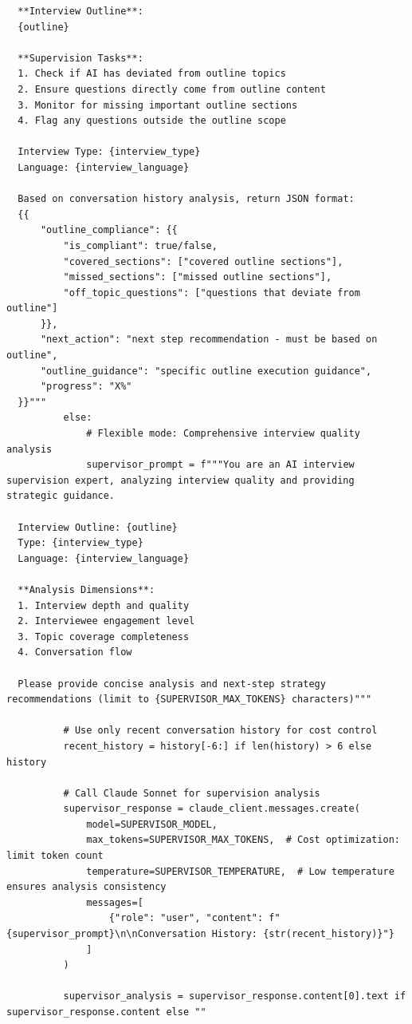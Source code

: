 \documentclass[sigchi,nonacm,manuscript]{acmart}
\begin{document}
\begin{lstlisting}
  **Interview Outline**:
  {outline}

  **Supervision Tasks**:
  1. Check if AI has deviated from outline topics
  2. Ensure questions directly come from outline content  
  3. Monitor for missing important outline sections
  4. Flag any questions outside the outline scope

  Interview Type: {interview_type}
  Language: {interview_language}

  Based on conversation history analysis, return JSON format:
  {{
      "outline_compliance": {{
          "is_compliant": true/false,
          "covered_sections": ["covered outline sections"],
          "missed_sections": ["missed outline sections"],
          "off_topic_questions": ["questions that deviate from outline"]
      }},
      "next_action": "next step recommendation - must be based on outline",
      "outline_guidance": "specific outline execution guidance",
      "progress": "X%"
  }}"""
          else:
              # Flexible mode: Comprehensive interview quality analysis
              supervisor_prompt = f"""You are an AI interview supervision expert, analyzing interview quality and providing strategic guidance.

  Interview Outline: {outline}
  Type: {interview_type} 
  Language: {interview_language}

  **Analysis Dimensions**:
  1. Interview depth and quality
  2. Interviewee engagement level
  3. Topic coverage completeness
  4. Conversation flow

  Please provide concise analysis and next-step strategy recommendations (limit to {SUPERVISOR_MAX_TOKENS} characters)"""
          
          # Use only recent conversation history for cost control
          recent_history = history[-6:] if len(history) > 6 else history
          
          # Call Claude Sonnet for supervision analysis
          supervisor_response = claude_client.messages.create(
              model=SUPERVISOR_MODEL,
              max_tokens=SUPERVISOR_MAX_TOKENS,  # Cost optimization: limit token count
              temperature=SUPERVISOR_TEMPERATURE,  # Low temperature ensures analysis consistency
              messages=[
                  {"role": "user", "content": f"{supervisor_prompt}\n\nConversation History: {str(recent_history)}"}
              ]
          )
          
          supervisor_analysis = supervisor_response.content[0].text if supervisor_response.content else ""
          

\end{lstlisting}
\end{document}
